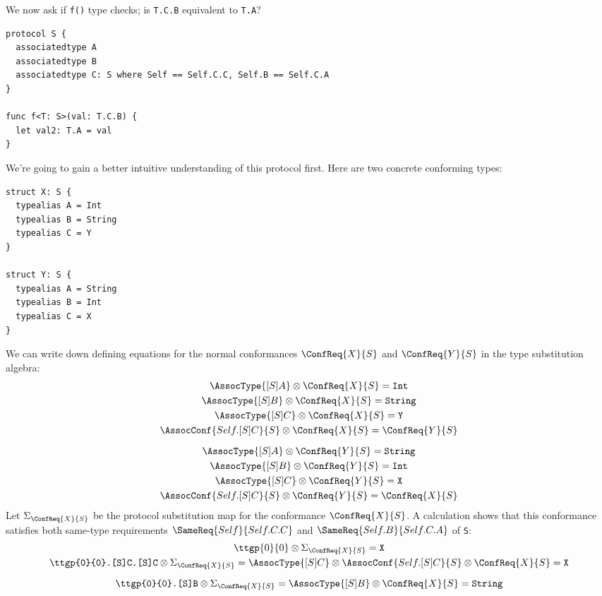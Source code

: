 \documentclass[../generics]{subfiles}
\begin{document}
\begin{example}\label{proto assoc rule}
We now ask if \texttt{f()} type checks; is \texttt{T.C.B} equivalent to \texttt{T.A}?
\begin{Verbatim}
protocol S {
  associatedtype A
  associatedtype B
  associatedtype C: S where Self == Self.C.C, Self.B == Self.C.A
}

func f<T: S>(val: T.C.B) {
  let val2: T.A = val
}
\end{Verbatim}
We're going to gain a better intuitive understanding of this protocol first. Here are two concrete conforming types:
\begin{Verbatim}
struct X: S {
  typealias A = Int
  typealias B = String
  typealias C = Y
}

struct Y: S {
  typealias A = String
  typealias B = Int
  typealias C = X
}
\end{Verbatim}
We can write down defining equations for the normal conformances $\ConfReq{X}{S}$ and $\ConfReq{Y}{S}$ in the type substitution algebra:
\begin{gather*}
\AssocType{[S]A} \otimes \ConfReq{X}{S} = \texttt{Int}\\
\AssocType{[S]B} \otimes \ConfReq{X}{S} = \texttt{String}\\
\AssocType{[S]C} \otimes \ConfReq{X}{S} = \texttt{Y}\\
\AssocConf{Self.[S]C}{S} \otimes \ConfReq{X}{S} = \ConfReq{Y}{S}\\[\medskipamount]
\AssocType{[S]A} \otimes \ConfReq{Y}{S} = \texttt{String}\\
\AssocType{[S]B} \otimes \ConfReq{Y}{S} = \texttt{Int}\\
\AssocType{[S]C} \otimes \ConfReq{Y}{S} = \texttt{X}\\
\AssocConf{Self.[S]C}{S} \otimes \ConfReq{Y}{S} = \ConfReq{X}{S}
\end{gather*}
Let $\Sigma_{\ConfReq{X}{S}}$ be the protocol substitution map for the conformance $\ConfReq{X}{S}$. A calculation shows that this conformance satisfies both same-type requirements $\SameReq{Self}{Self.C.C}$ and $\SameReq{Self.B}{Self.C.A}$ of \texttt{S}:
\begin{gather*}
\ttgp{0}{0}\otimes\Sigma_{\ConfReq{X}{S}}=\texttt{X}\\
\texttt{\ttgp{0}{0}.[S]C.[S]C}\otimes\Sigma_{\ConfReq{X}{S}}=\AssocType{[S]C}\otimes\AssocConf{Self.[S]C}{S}\otimes\ConfReq{X}{S}=\texttt{X}\\[\medskipamount]
\texttt{\ttgp{0}{0}.[S]B}\otimes\Sigma_{\ConfReq{X}{S}}=\AssocType{[S]B}\otimes\ConfReq{X}{S}=\texttt{String}\\

\end{gather*}
\end{example}
\end{document}
